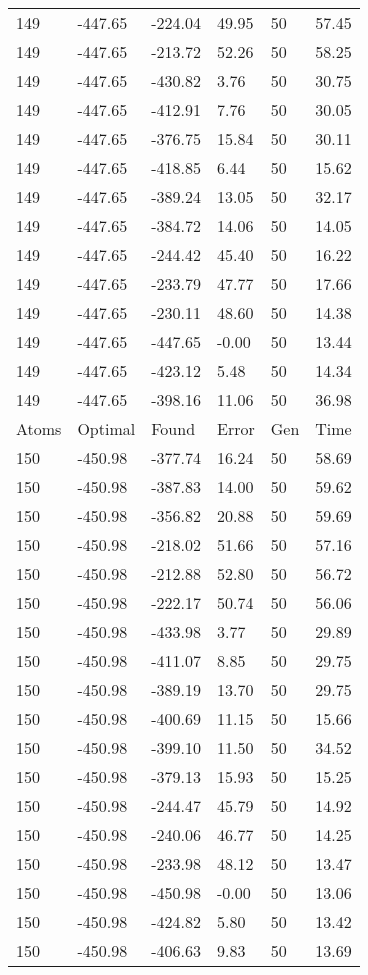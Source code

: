 \documentclass{report}
\begin{document}
\begin{appendix}
\begin{longtable}{llllll}
149 & -447.65 & -224.04 & 49.95 & 50 & 57.45 \\
149 & -447.65 & -213.72 & 52.26 & 50 & 58.25 \\
149 & -447.65 & -430.82 & 3.76 & 50 & 30.75 \\
149 & -447.65 & -412.91 & 7.76 & 50 & 30.05 \\
149 & -447.65 & -376.75 & 15.84 & 50 & 30.11 \\
149 & -447.65 & -418.85 & 6.44 & 50 & 15.62 \\
149 & -447.65 & -389.24 & 13.05 & 50 & 32.17 \\
149 & -447.65 & -384.72 & 14.06 & 50 & 14.05 \\
149 & -447.65 & -244.42 & 45.40 & 50 & 16.22 \\
149 & -447.65 & -233.79 & 47.77 & 50 & 17.66 \\
149 & -447.65 & -230.11 & 48.60 & 50 & 14.38 \\
149 & -447.65 & -447.65 & -0.00 & 50 & 13.44 \\
149 & -447.65 & -423.12 & 5.48 & 50 & 14.34 \\
149 & -447.65 & -398.16 & 11.06 & 50 & 36.98 \\
Atoms & Optimal & Found & Error & Gen & Time \\
150 & -450.98 & -377.74 & 16.24 & 50 & 58.69 \\
150 & -450.98 & -387.83 & 14.00 & 50 & 59.62 \\
150 & -450.98 & -356.82 & 20.88 & 50 & 59.69 \\
150 & -450.98 & -218.02 & 51.66 & 50 & 57.16 \\
150 & -450.98 & -212.88 & 52.80 & 50 & 56.72 \\
150 & -450.98 & -222.17 & 50.74 & 50 & 56.06 \\
150 & -450.98 & -433.98 & 3.77 & 50 & 29.89 \\
150 & -450.98 & -411.07 & 8.85 & 50 & 29.75 \\
150 & -450.98 & -389.19 & 13.70 & 50 & 29.75 \\
150 & -450.98 & -400.69 & 11.15 & 50 & 15.66 \\
150 & -450.98 & -399.10 & 11.50 & 50 & 34.52 \\
150 & -450.98 & -379.13 & 15.93 & 50 & 15.25 \\
150 & -450.98 & -244.47 & 45.79 & 50 & 14.92 \\
150 & -450.98 & -240.06 & 46.77 & 50 & 14.25 \\
150 & -450.98 & -233.98 & 48.12 & 50 & 13.47 \\
150 & -450.98 & -450.98 & -0.00 & 50 & 13.06 \\
150 & -450.98 & -424.82 & 5.80 & 50 & 13.42 \\
150 & -450.98 & -406.63 & 9.83 & 50 & 13.69
\end{longtable}
\end{appendix}
\end{document}
